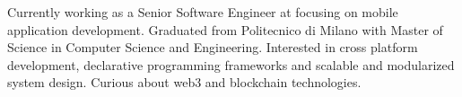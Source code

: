 
\begin{cvparagraph}

Currently working as a Senior Software Engineer at  focusing on mobile application development. Graduated from Politecnico di Milano with Master of Science in Computer Science and Engineering. Interested in cross platform development, declarative programming frameworks and scalable and modularized system design. Curious about web3 and blockchain technologies.
\end{cvparagraph}

%